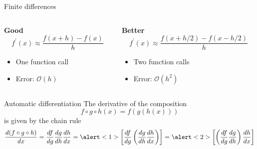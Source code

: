 \documentclass[12pt,aspectratio=169]{beamer}
\begin{document}
\begin{frame}{Finite differences}
    \begin{columns}
        \begin{column}{0.5\textwidth}
            \centering
            {\large\bf%
             Good}
            \vfill
            \[
                f^{\prime}(x) \approx \frac{f(x + h) - f(x)}{h}
            \]
            \vfill
            \begin{itemize}
                \item One function call
                \item Error: $\mathcal{O}(h)$
            \end{itemize}
        \end{column}
        \begin{column}{0.5\textwidth}
            \centering
            {\large\bf%
             Better}
            \vfill
            \[
                f^{\prime}(x) \approx \frac{f(x + h/2) - f(x - h/2)}{h}
            \]
            \vfill
            \begin{itemize}
                \item Two function calls
                \item Error: $\mathcal{O}(h^{2})$
            \end{itemize}
        \end{column}
    \end{columns}
\end{frame}

\begin{frame}{Automatic differentiation}
    The derivative of the composition
    \[
        f \circ g \circ h(x) = f(g(h(x)))
    \]
    is given by the chain rule
    \[
        \frac{d (f \circ g \circ h)}{d x}
        = \frac{d f}{d g} \frac{d g}{d h} \frac{d h}{d x}
        = \alert<1>{\left[ \frac{d f}{d g} \left( \frac{d g}{d h} \frac{d h}{d x} \right) \right]}
        = \alert<2>{\left[ \left( \frac{d f}{d g} \frac{d g}{d h} \right) \frac{d h}{d x} \right]}
    \]
\end{frame}
\end{document}
